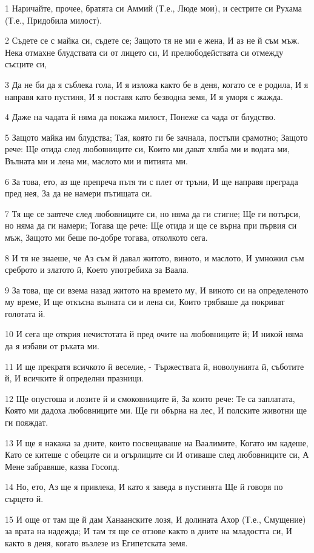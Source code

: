 \par 1 Наричайте, прочее, братята си Аммий (Т.е., Люде мои),  и сестрите си Рухама (Т.е., Придобила милост).
\par 2 Съдете се с майка си, съдете се; Защото тя не ми е жена, И аз не й съм мъж. Нека отмахне блудствата си от лицето си, И прелюбодействата си отмежду съсците си,
\par 3 Да не би да я съблека гола, И я изложа както бе в деня, когато се е родила, И я направя като пустиня, И я поставя като безводна земя, И я уморя с жажда.
\par 4 Даже на чадата й няма да покажа милост, Понеже са чада от блудство.
\par 5 Защото майка им блудства; Тая, която ги бе зачнала, постъпи срамотно; Защото рече: Ще отида след любовниците си, Които ми дават хляба ми и водата ми, Вълната ми и лена ми, маслото ми и питията ми.
\par 6 За това, ето, аз ще препреча пътя ти с плет от тръни, И ще направя преграда пред нея, За да не намери пътищата си.
\par 7 Тя ще се завтече след любовниците си, но няма да ги стигне; Ще ги потърси, но няма да ги намери; Тогава ще рече: Ще отида и ще се върна при първия си мъж, Защото ми беше по-добре тогава, отколкото сега.
\par 8 И тя не знаеше, че Аз съм й давал житото, виното, и маслото, И умножил съм среброто и златото й, Което употребиха за Ваала.
\par 9 За това, ще си взема назад житото на времето му, И виното си на определеното му време, И ще откъсна вълната си и лена си, Които трябваше да покриват голотата й.
\par 10 И сега ще открия нечистотата й пред очите на любовниците й; И никой няма да я избави от ръката ми.
\par 11 И ще прекратя всичкото й веселие, - Тържествата й, новолунията й, съботите й, И всичките й определни празници.
\par 12 Ще опустоша и лозите й и смоковниците й, За които рече: Те са заплатата, Която ми дадоха любовниците ми. Ще ги обърна на лес, И полските животни ще ги пояждат.
\par 13 И ще я накажа за дните, които посвещаваше на Ваалимите, Когато им кадеше, Като се китеше с обеците си и огърлиците си И отиваше след любовниците си, А Мене забравяше, казва Госопд.
\par 14 Но, ето, Аз ще я привлека, И като я заведа в пустинята Ще й говоря по сърцето й.
\par 15 И още от там ще й дам Ханаанските лозя, И долината Ахор (Т.е., Смущение) за врата на надежда; И там тя ще се отзове както в дните на младостта си, И както в деня, когато възлезе из Египетската земя.
